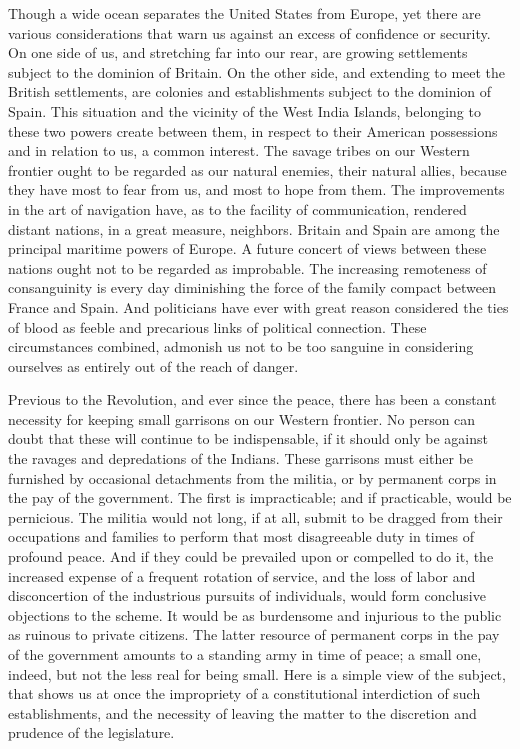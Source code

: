 Though a wide ocean separates the United States from Europe, yet there are various considerations that warn us against an excess of confidence or security. On one side of us, and stretching far into our rear, are growing settlements subject to the dominion of Britain. On the other side, and extending to meet the British settlements, are colonies and establishments subject to the dominion of Spain. This situation and the vicinity of the West India Islands, belonging to these two powers create between them, in respect to their American possessions and in relation to us, a common interest. The savage tribes on our Western frontier ought to be regarded as our natural enemies, their natural allies, because they have most to fear from us, and most to hope from them. The improvements in the art of navigation have, as to the facility of communication, rendered distant nations, in a great measure, neighbors. Britain and Spain are among the principal maritime powers of Europe. A future concert of views between these nations ought not to be regarded as improbable. The increasing remoteness of consanguinity is every day diminishing the force of the family compact between France and Spain. And politicians have ever with great reason considered the ties of blood as feeble and precarious links of political connection. These circumstances combined, admonish us not to be too sanguine in considering ourselves as entirely out of the reach of danger.

Previous to the Revolution, and ever since the peace, there has been a constant necessity for keeping small garrisons on our Western frontier. No person can doubt that these will continue to be indispensable, if it should only be against the ravages and depredations of the Indians. These garrisons must either be furnished by occasional detachments from the militia, or by permanent corps in the pay of the government. The first is impracticable; and if practicable, would be pernicious. The militia would not long, if at all, submit to be dragged from their occupations and families to perform that most disagreeable duty in times of profound peace. And if they could be prevailed upon or compelled to do it, the increased expense of a frequent rotation of service, and the loss of labor and disconcertion of the industrious pursuits of individuals, would form conclusive objections to the scheme. It would be as burdensome and injurious to the public as ruinous to private citizens. The latter resource of permanent corps in the pay of the government amounts to a standing army in time of peace; a small one, indeed, but not the less real for being small. Here is a simple view of the subject, that shows us at once the impropriety of a constitutional interdiction of such establishments, and the necessity of leaving the matter to the discretion and prudence of the legislature.

